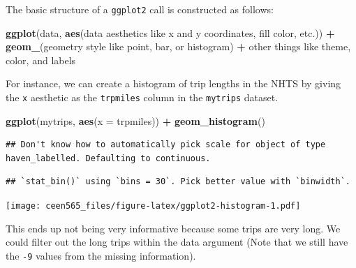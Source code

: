 \documentclass[
]{book}
\newenvironment{Shaded}{\begin{snugshade}}{\end{snugshade}}
\newcommand{\DataTypeTok}[1]{\textcolor[rgb]{0.13,0.29,0.53}{#1}}
\newcommand{\DecValTok}[1]{\textcolor[rgb]{0.00,0.00,0.81}{#1}}
\newcommand{\KeywordTok}[1]{\textcolor[rgb]{0.13,0.29,0.53}{\textbf{#1}}}
\newcommand{\NormalTok}[1]{#1}
\newcommand{\OperatorTok}[1]{\textcolor[rgb]{0.81,0.36,0.00}{\textbf{#1}}}
\newcommand{\StringTok}[1]{\textcolor[rgb]{0.31,0.60,0.02}{#1}}
\begin{document}
The basic structure of a \texttt{ggplot2} call is constructed as follows:

\begin{Shaded}
\begin{Highlighting}[]
\KeywordTok{ggplot}\NormalTok{(data, }\KeywordTok{aes}\NormalTok{(data aesthetics like x and y coordinates, fill color, etc.)) }\OperatorTok{+}
\StringTok{  }\KeywordTok{geom_}\NormalTok{(geometry style like point, bar, or histogram) }\OperatorTok{+}
\StringTok{  }\NormalTok{other things like theme, color, and labels}
\end{Highlighting}
\end{Shaded}

For instance, we can create a histogram of trip lengths in the NHTS by giving
the \texttt{x} aesthetic as the \texttt{trpmiles} column in the \texttt{mytrips} dataset.

\begin{Shaded}
\begin{Highlighting}[]
\KeywordTok{ggplot}\NormalTok{(mytrips, }\KeywordTok{aes}\NormalTok{(}\DataTypeTok{x =}\NormalTok{ trpmiles)) }\OperatorTok{+}\StringTok{ }
\StringTok{  }\KeywordTok{geom_histogram}\NormalTok{()}
\end{Highlighting}
\end{Shaded}

\begin{verbatim}
## Don't know how to automatically pick scale for object of type haven_labelled. Defaulting to continuous.
\end{verbatim}

\begin{verbatim}
## `stat_bin()` using `bins = 30`. Pick better value with `binwidth`.
\end{verbatim}

\texttt{[image: ceen565\_files/figure-latex/ggplot2-histogram-1.pdf]}

This ends up not being very informative because some trips are very long. We
could filter out the long trips within the data argument (Note that we still have
the \texttt{-9} values from the missing information).

\begin{Shaded}
\end{Shaded}
\end{document}
